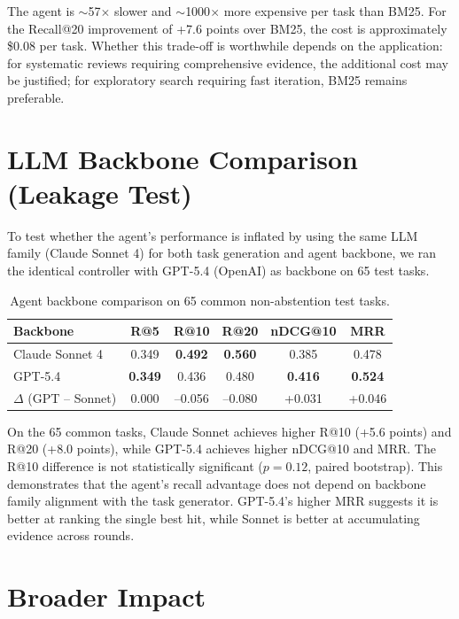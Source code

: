 \documentclass{article}
\begin{document}
The agent is ${\sim}$57$\times$ slower and ${\sim}$1000$\times$ more expensive per task than BM25. For the Recall@20 improvement of +7.6 points over BM25, the cost is approximately \$0.08 per task. Whether this trade-off is worthwhile depends on the application: for systematic reviews requiring comprehensive evidence, the additional cost may be justified; for exploratory search requiring fast iteration, BM25 remains preferable.

\section{LLM Backbone Comparison (Leakage Test)}
\label{app:leakage}

To test whether the agent's performance is inflated by using the same LLM family (Claude Sonnet 4) for both task generation and agent backbone, we ran the identical controller with GPT-5.4 (OpenAI) as backbone on 65 test tasks.

\begin{table}[ht]
\centering
\caption{Agent backbone comparison on 65 common non-abstention test tasks.}
\small
\begin{tabular}{lccccc}
\toprule
\textbf{Backbone} & \textbf{R@5} & \textbf{R@10} & \textbf{R@20} & \textbf{nDCG@10} & \textbf{MRR} \\
\midrule
Claude Sonnet 4 & 0.349 & \textbf{0.492} & \textbf{0.560} & 0.385 & 0.478 \\
GPT-5.4 & \textbf{0.349} & 0.436 & 0.480 & \textbf{0.416} & \textbf{0.524} \\
\midrule
$\Delta$ (GPT -- Sonnet) & 0.000 & --0.056 & --0.080 & +0.031 & +0.046 \\
\bottomrule
\end{tabular}
\end{table}

On the 65 common tasks, Claude Sonnet achieves higher R@10 (+5.6 points) and R@20 (+8.0 points), while GPT-5.4 achieves higher nDCG@10 and MRR. The R@10 difference is not statistically significant ($p{=}0.12$, paired bootstrap). This demonstrates that the agent's recall advantage does not depend on backbone family alignment with the task generator. GPT-5.4's higher MRR suggests it is better at ranking the single best hit, while Sonnet is better at accumulating evidence across rounds.

\section{Broader Impact}
\label{app:impact}
\end{document}
